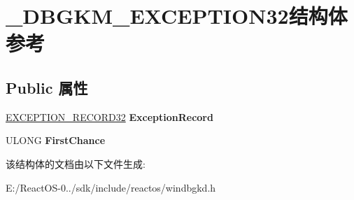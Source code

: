 \hypertarget{struct___d_b_g_k_m___e_x_c_e_p_t_i_o_n32}{}\section{\+\_\+\+D\+B\+G\+K\+M\+\_\+\+E\+X\+C\+E\+P\+T\+I\+O\+N32结构体 参考}
\label{struct___d_b_g_k_m___e_x_c_e_p_t_i_o_n32}
\subsection*{Public 属性}
\begin{DoxyCompactItemize}
\item 
\mbox{\label{struct___d_b_g_k_m___e_x_c_e_p_t_i_o_n32_a66b4e173e0632ecc918c75e8e357526f}} 
\hyperlink{struct___e_x_c_e_p_t_i_o_n___r_e_c_o_r_d32}{E\+X\+C\+E\+P\+T\+I\+O\+N\+\_\+\+R\+E\+C\+O\+R\+D32} {\bfseries Exception\+Record}
\item 
\mbox{\label{struct___d_b_g_k_m___e_x_c_e_p_t_i_o_n32_aea5dc70f3142000dd48700c6b6470959}} 
U\+L\+O\+NG {\bfseries First\+Chance}
\end{DoxyCompactItemize}


该结构体的文档由以下文件生成\+:\begin{DoxyCompactItemize}
\item 
E\+:/\+React\+O\+S-\/0../sdk/include/reactos/windbgkd.\+h\end{DoxyCompactItemize}
